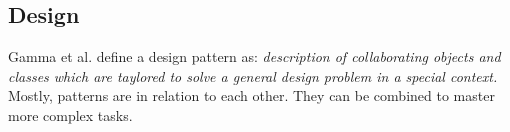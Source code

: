 %
%
%
%
%
%
%

\subsection{Design}
\label{design_heading}

Gamma et al. \cite{gamma1995} define a design pattern as: \textit{description of
collaborating objects and classes which are taylored to solve a general design
problem in a special context.} Mostly, patterns are in relation to each other.
They can be combined to master more complex tasks.








